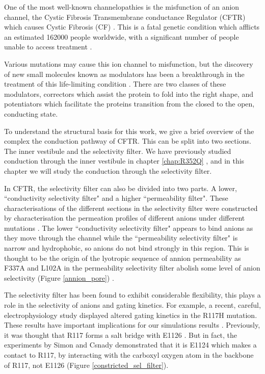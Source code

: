One of the most well-known channelopathies is the misfunction of an anion channel, the Cystic Fibrosis Transmembrane conductance Regulator (CFTR) which causes Cystic Fibrosis (CF) \cite{riordan1989,gadsby2006}. This is a fatal genetic condition which afflicts an estimated 162000 people worldwide, with a significant number of people unable to access treatment \cite{guo2022}.

Various mutations may cause this ion channel to misfunction, but the discovery of new small molecules known as modulators has been a breakthrough in the treatment of this life-limiting condition \cite{}. There are two classes of these modulators, correctors which assist the protein to fold into the right shape, and potentiators which facilitate the proteins transition from the closed to the open, conducting state. 

To understand the structural basis for this work, we give a brief overview of the complex the conduction pathway of CFTR. This can be split into two sections. The inner vestibule and the selectivity filter. We have previously studied conduction through the inner vestibule in chapter \ref{chap:R352Q} \cite{wong2022a}, and in this chapter we will study the conduction through the selectivity filter. 

In CFTR, the selectivity filter can also be divided into two parts. A lower, ``conductivity selectivity filter" and a higher ``permeability filter". These characterisations of the different sections in the selectivity filter were constructed by characterisation the permeation profiles of different anions under different mutations \cite{linsdell2016}. The lower ``conductivity selectivity filter" appears to bind anions as they move through the channel while the ``permeability selectivity filter" is narrow and hydrophobic, so anions do not bind strongly in this region. This is thought to be the origin of the lyotropic sequence of annion permeability as F337A and L102A in the permeability selectivity filter abolish some level of anion selectivity (Figure \ref{annion_pore}) \cite{linsdell2021}. 

The selectivity filter has been found to exhibit considerable flexibility, this plays a role in the selectivity of anions and gating kinetics. For example, a recent, careful, electrophysiology study displayed altered gating kinetics in the R117H mutation. These results have important implications for our simulations results \cite{simon2021}. Previously, it was thought that R117 forms a salt bridge with E1126 \cite{cui2014}. But in fact, the experiments by Simon and Csnady demonstrated that it is E1124 which makes a contact to R117, by interacting with the carboxyl oxygen atom in the backbone of R117, not E1126 (Figure \ref{constricted_sel_filter}). 

